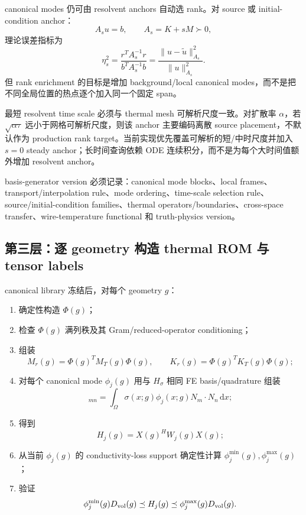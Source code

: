 canonical modes 仍可由 resolvent anchors 自动选 rank。对 source 或 initial-condition anchor：
\begin{equation}
A_su=b,\qquad A_s=K+sM\succ0,
\end{equation}
理论误差指标为
\begin{equation}
\boxed{
\eta_s^2
=\frac{r^TA_s^{-1}r}{b^TA_s^{-1}b}
=\frac{\|u-\tilde u\|_{A_s}^2}{\|u\|_{A_s}^2}.
}
\end{equation}
但 rank enrichment 的目标是增加 background/local canonical modes，而不是把不同全局位置的热点逐个加入同一个固定 span。

最短 resolvent time scale 必须与 thermal mesh 可解析尺度一致。对扩散率 $\alpha$，若 $\sqrt{\alpha\tau}$ 远小于网格可解析尺度，则该 anchor 主要编码离散 source placement，不默认作为 production rank target。当前实现优先覆盖可解析的短/中时尺度并加入 $s=0$ steady anchor；长时间查询依赖 ODE 连续积分，而不是为每个大时间值额外增加 resolvent anchor。

basis-generator version 必须记录：canonical mode blocks、local frames、transport/interpolation rule、mode ordering、time-scale selection rule、source/initial-condition families、thermal operators/boundaries、cross-space transfer、wire-temperature functional 和 truth-physics version。

\subsection{第三层：逐 geometry 构造 thermal ROM 与 tensor labels}
canonical library 冻结后，对每个 geometry $g$：
\begin{enumerate}
  \item 确定性构造 $\Phi(g)$；
  \item 检查 $\Phi(g)$ 满列秩及其 Gram/reduced-operator conditioning；
  \item 组装
  \begin{equation}
  M_r(g)=\Phi(g)^TM_T(g)\Phi(g),\qquad
  K_r(g)=\Phi(g)^TK_T(g)\Phi(g);
  \end{equation}
  \item 对每个 canonical mode $\phi_j(g)$ 用与 $H_\sigma$ 相同 FE basis/quadrature 组装
  \begin{equation}
  [W_j(g)]_{mn}=\int_\Omega\sigma(x;g)\phi_j(x;g)N_m\cdot N_n\,\mathrm dx;
  \end{equation}
  \item 得到
  \begin{equation}
  \boxed{H_j(g)=X(g)^HW_j(g)X(g)};
  \end{equation}
  \item 从当前 $\phi_j(g)$ 的 conductivity-loss support 确定性计算 $\phi_j^{\min}(g),\phi_j^{\max}(g)$；
  \item 验证
  \begin{equation}
  \phi_j^{\min}(g)D_{\rm vol}(g)
  \preceq H_j(g)
  \preceq\phi_j^{\max}(g)D_{\rm vol}(g).
  \end{equation}
\end{enumerate}

